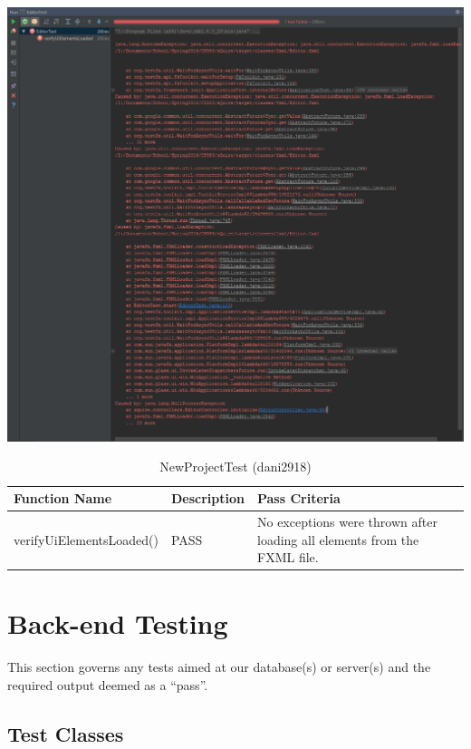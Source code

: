 \documentclass[14pt, a4paper]{article}
\begin{document}
\includegraphics[width=\textwidth]{EditorTestException} 

\begin{table}[h]
	\centering
	\caption{NewProjectTest (dani2918)}
	\begin{tabular}{|p{5cm}|p{3cm}|p{4cm}|}
		\hline
		\textbf{Function Name} & \textbf{Description} & \textbf{Pass Criteria}  \\\hline
		verifyUiElementsLoaded() & PASS & No exceptions were thrown after loading all elements from the FXML file. \\\hline
	\end{tabular}
\end{table}


\newpage
\section{Back-end Testing}

This section governs any tests aimed at our database(s) or server(s) and the required output deemed as a ``pass''. \\

\subsection{Test Classes}
\end{document}
